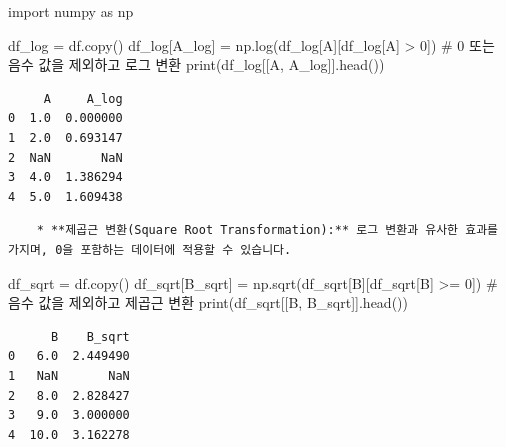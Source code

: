 \documentclass[
  letterpaper,
]{book}
\newenvironment{Shaded}{\begin{snugshade}}{\end{snugshade}}
\newcommand{\BuiltInTok}[1]{\textcolor[rgb]{0.00,0.23,0.31}{#1}}
\newcommand{\CommentTok}[1]{\textcolor[rgb]{0.37,0.37,0.37}{#1}}
\newcommand{\DecValTok}[1]{\textcolor[rgb]{0.68,0.00,0.00}{#1}}
\newcommand{\ImportTok}[1]{\textcolor[rgb]{0.00,0.46,0.62}{#1}}
\newcommand{\NormalTok}[1]{\textcolor[rgb]{0.00,0.23,0.31}{#1}}
\newcommand{\OperatorTok}[1]{\textcolor[rgb]{0.37,0.37,0.37}{#1}}
\newcommand{\StringTok}[1]{\textcolor[rgb]{0.13,0.47,0.30}{#1}}
\begin{document}
\begin{Shaded}
\begin{Highlighting}[]
    \ImportTok{import}\NormalTok{ numpy }\ImportTok{as}\NormalTok{ np}

\NormalTok{    df\_log }\OperatorTok{=}\NormalTok{ df.copy()}
\NormalTok{    df\_log[}\StringTok{\textquotesingle{}A\_log\textquotesingle{}}\NormalTok{] }\OperatorTok{=}\NormalTok{ np.log(df\_log[}\StringTok{\textquotesingle{}A\textquotesingle{}}\NormalTok{][df\_log[}\StringTok{\textquotesingle{}A\textquotesingle{}}\NormalTok{] }\OperatorTok{\textgreater{}} \DecValTok{0}\NormalTok{]) }\CommentTok{\# 0 또는 음수 값을 제외하고 로그 변환}
    \BuiltInTok{print}\NormalTok{(df\_log[[}\StringTok{\textquotesingle{}A\textquotesingle{}}\NormalTok{, }\StringTok{\textquotesingle{}A\_log\textquotesingle{}}\NormalTok{]].head())}
\end{Highlighting}
\end{Shaded}

\begin{verbatim}
     A     A_log
0  1.0  0.000000
1  2.0  0.693147
2  NaN       NaN
3  4.0  1.386294
4  5.0  1.609438
\end{verbatim}

\begin{verbatim}
    * **제곱근 변환(Square Root Transformation):** 로그 변환과 유사한 효과를 가지며, 0을 포함하는 데이터에 적용할 수 있습니다.
\end{verbatim}

\begin{Shaded}
\begin{Highlighting}[]
\NormalTok{    df\_sqrt }\OperatorTok{=}\NormalTok{ df.copy()}
\NormalTok{    df\_sqrt[}\StringTok{\textquotesingle{}B\_sqrt\textquotesingle{}}\NormalTok{] }\OperatorTok{=}\NormalTok{ np.sqrt(df\_sqrt[}\StringTok{\textquotesingle{}B\textquotesingle{}}\NormalTok{][df\_sqrt[}\StringTok{\textquotesingle{}B\textquotesingle{}}\NormalTok{] }\OperatorTok{\textgreater{}=} \DecValTok{0}\NormalTok{]) }\CommentTok{\# 음수 값을 제외하고 제곱근 변환}
    \BuiltInTok{print}\NormalTok{(df\_sqrt[[}\StringTok{\textquotesingle{}B\textquotesingle{}}\NormalTok{, }\StringTok{\textquotesingle{}B\_sqrt\textquotesingle{}}\NormalTok{]].head())}
\end{Highlighting}
\end{Shaded}

\begin{verbatim}
      B    B_sqrt
0   6.0  2.449490
1   NaN       NaN
2   8.0  2.828427
3   9.0  3.000000
4  10.0  3.162278
\end{verbatim}
\end{document}
